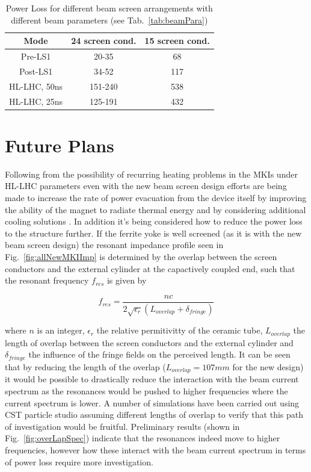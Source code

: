 \documentclass[a4paper,
              ]{jacow}
\begin{document}
\begin{table}
\caption{Power Loss for different beam screen arrangements with different beam parameters (see Tab.~\ref{tab:beamPara})}
\label{tab:powLoss}
\begin{center}
\begin{tabular}{c | c | c}
Mode & 24 screen cond. & 15 screen cond. \\ \hline 
Pre-LS1 & 20-35 & 68 \\ \hline 
Post-LS1 & 34-52 & 117 \\ \hline 
HL-LHC, 50ns & 151-240 & 538  \\ \hline 
HL-LHC, 25ns & 125-191 & 432  \\ 
\end{tabular}
\end{center}
\end{table}

\section{Future Plans}

Following from the possibility of recurring heating problems in the MKIs under HL-LHC parameters even with the new beam screen design efforts are being made to increase the rate of power evacuation from the device itself by improving the ability of the magnet to radiate thermal energy and by considering additional cooling solutions \cite{mkiCoolling}. In addition it's being considered how to reduce the power loss to the structure further. If the ferrite yoke is well screened (as it is with the new beam screen design) the resonant impedance profile seen in Fig.~\ref{fig:allNewMKIImp} is determined by the overlap between the screen conductors and the external cylinder at the capactively coupled end, such that the resonant frequency $f_{res}$ is given by

\begin{equation}
f_{res} = \frac{n c}{2 \sqrt{\epsilon_{r}}\left( L_{overlap} + \delta_{fringe} \right)}
\end{equation}

where $n$ is an integer, $\epsilon_{r}$ the relative permitivitty of the ceramic tube, $L_{overlap}$ the length of overlap between the screen conductors and the external cylinder and $\delta_{fringe}$ the influence of the fringe fields on the perceived length. It can be seen that by reducing the length of the overlap ($L_{overlap}=107mm$ for the new design) it would be possible to drastically reduce the interaction with the beam current spectrum as the resonances would be pushed to higher frequencies where the current spectrum is lower. A number of simulations have been carried out using CST particle studio \cite{cst-cite} assuming different lengths of overlap to verify that this path of investigation would be fruitful. Preliminary results (shown in Fig.~\ref{fig:overLapSpec}) indicate that the resonances indeed move to higher frequencies, however how these interact with the beam current spectrum in terms of power loss require more investigation.
\end{document}
